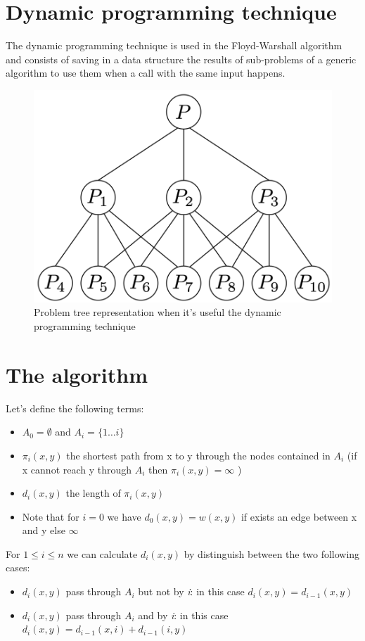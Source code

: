 \documentclass[10pt,a4paper]{book}
\begin{document}
		\section{Dynamic programming technique}
		The dynamic programming technique is used in the Floyd-Warshall algorithm and consists of saving in a data structure the results of sub-problems of a generic algorithm to use them when a call with the same input happens.
		\begin{figure}
			\centering
			\includegraphics[width=0.5\linewidth]{img/DeepinScreenshot_20180222212118}
			\caption{Problem tree representation when it's useful the dynamic programming technique}
			\label{fig:deepinscreenshot20180222212118}
		\end{figure}
		\section{The algorithm}
		Let's define the following terms:
		\begin{itemize}
			\item $ A_0 = \emptyset $ and $ A_i = \{1 \dots i \} $
			\item $ \pi_i(x,y) $ the shortest path from x to y through the nodes contained in $ A_i $ (if x cannot reach y through $ A_i $ then $  \pi_i(x,y) = \infty $ )
			\item  $ d_i(x,y) $ the length of $ \pi_i(x,y) $
			\item Note that for $ i = 0 $ we have $ d_0(x,y) = w(x,y) $ if exists an edge between x and y else $ \infty $
		\end{itemize}
		For $ 1 \leq i \leq n $ we can calculate $ d_i(x,y) $ by distinguish between the two following cases:
		\begin{itemize}
			\item $ d_i(x,y)  $ pass through $ A_i $ but not by \textit{i}: in this case $ d_i(x,y) = d_{i-1}(x,y) $
			\item $ d_i(x,y)  $ pass through $ A_i $ and by \textit{i}: in this case $ d_i(x,y) = d_{i-1}(x,i) + d_{i-1}(i, y) $
		\end{itemize}
\end{document}
